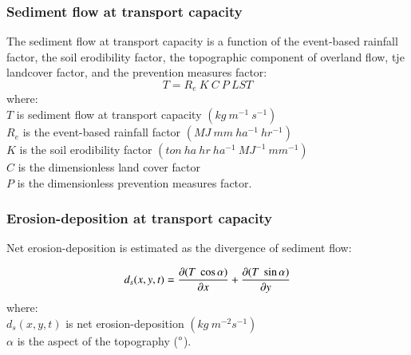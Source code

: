\documentclass[final,3p,times,twocolumn]{elsarticle}
\begin{document}
\subsubsection{Sediment flow at transport capacity} 
The sediment flow at transport capacity is a function of 
the event-based rainfall factor, the soil erodibility factor, 
the topographic component of overland flow,
tje landcover factor, and the prevention measures factor:
%
\begin{equation}
\label{eq:usped}
{T = R_e ~ K ~ C ~ P ~ LST}
\end{equation}
%
{\small
\noindent
where: \\
\noindent
\hspace*{0.5em} $T$ is sediment flow at transport capacity $(kg ~ m^{-1} ~ s^{-1})$\\ 
\hspace*{0.5em} $R_e$ is the event-based rainfall factor $(MJ ~ mm ~ ha^{-1} ~ hr^{-1})$\\
\hspace*{0.5em} $K$ is the soil erodibility factor $(ton ~ ha ~ hr ~ ha^{-1} ~ MJ^{-1} ~ mm^{-1})$\\ %
\hspace*{0.5em} $C$ is the dimensionless land cover factor\\
\hspace*{0.5em} $P$ is the dimensionless prevention measures factor.\\
}

\subsubsection{Erosion-deposition at transport capacity}
Net erosion-deposition is estimated as the divergence of sediment flow: 

\begin{equation}\label{eq:usped_erdep} 
d_s(x,y,t) = 
{\partial (T ~ \cos \alpha) \over \partial x} +
{\partial (T ~ \sin \alpha) \over \partial y}
\end{equation}
%
{\small
\noindent
where: \\
\hspace*{0.5em} $d_s(x,y,t)$ is net erosion-deposition $(kg ~ m^{-2} s^{-1})$\\
\hspace*{0.5em} $\alpha$ is the aspect of the topography ($\degree$).\\
}
\end{document}
